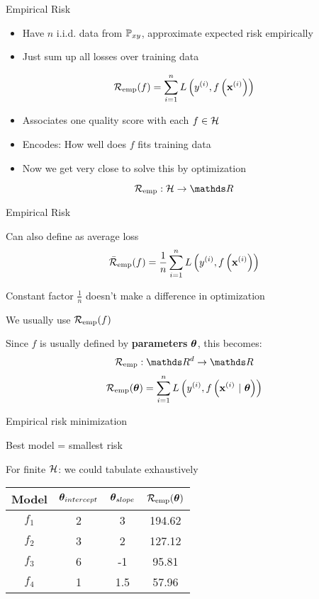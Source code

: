 \documentclass[11pt,compress,t,notes=noshow, xcolor=table]{beamer}
\begin{document}
\begin{frame}{Empirical Risk}
\begin{itemize}
  \item Have $n$ i.i.d. data from $\mathbb{P}_{xy}$, approximate expected risk empirically
  \item Just sum up all losses over training data
\end{itemize}
$$
\mathcal{R}_{\text{emp}}(f) = \sum\limits_{i=1}^n L\left(y^{(i)}, f\left(\mathbf{x}^{(i)}\right)\right)
$$
\begin{itemize}
  \item Associates one quality score with each $f \in \mathcal{H}$
  \item Encodes: How well does $f$ fits training data
  \item Now we get very close to solve this by optimization 
\end{itemize}
$$
\riske: \Hspace \to \R
$$
\end{frame}


\begin{framei}{Empirical Risk}
\item Can also define as average loss
$$
\bar{\mathcal{R}}_{\text{emp}}(f) = \frac{1}{n}\sum\limits_{i=1}^n L\left(y^{(i)}, f\left(\mathbf{x}^{(i)}\right)\right)
$$
\item Constant factor $\frac{1}{n}$ doesn't make a difference in optimization
\item We usually use $\mathcal{R}_{\text{emp}}(f)$ 
\item Since $f$ is usually defined by \textbf{parameters} $\bm{\theta}$, this becomes:
$$
\riske : \R^d \to \R
$$
$$
\mathcal{R}_{\text{emp}}(\bm{\theta}) = \sum\limits_{i=1}^n L\left(y^{(i)}, f\left(\mathbf{x}^{(i)} ~|~ \bm{\theta}\right)\right)
$$
\end{framei}


\begin{framei}{Empirical risk minimization}
\item Best model = smallest risk
\item For finite $\mathcal{H}$: we could tabulate exhaustively
\vfill
\begin{center}
\begin{tabular}{ c | c | c || c } %
Model & \(\displaystyle \bm{\theta}_{intercept} \) & \(\displaystyle \bm{\theta}_{slope} \) & \(\displaystyle \mathcal{R}_{\text{emp}}(\bm{\theta}) \) \\ 
\hline
\(\displaystyle f_1 \)   & 2 & 3 & 194.62 \\
\(\displaystyle f_2 \)   & 3 & 2 & 127.12 \\  
\(\displaystyle f_3 \)   & 6 & -1 & 95.81 \\
\rowcolor{lightgray}
\(\displaystyle f_4 \)   & 1 & 1.5 & 57.96 \\  
\end{tabular}
\end{center}
\end{framei}
\end{document}

